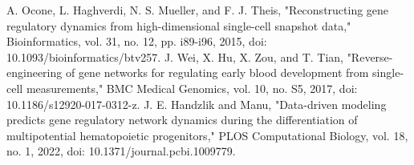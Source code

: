 \documentclass[conference]{IEEEtran}
\begin{document}
\begin{thebibliography}{00}
 A. Ocone, L. Haghverdi, N. S. Mueller, and F. J. Theis, "Reconstructing gene regulatory dynamics from high-dimensional single-cell snapshot data," Bioinformatics, vol. 31, no. 12, pp. i89-i96, 2015, doi: 10.1093/bioinformatics/btv257.
 J. Wei, X. Hu, X. Zou, and T. Tian, "Reverse-engineering of gene networks for regulating early blood development from single-cell measurements," BMC Medical Genomics, vol. 10, no. S5, 2017, doi: 10.1186/s12920-017-0312-z.
 J. E. Handzlik and Manu, "Data-driven modeling predicts gene regulatory network dynamics during the differentiation of multipotential hematopoietic progenitors," PLOS Computational Biology, vol. 18, no. 1, 2022, doi: 10.1371/journal.pcbi.1009779.





\end{thebibliography}
\vspace{12pt}
\end{document}
